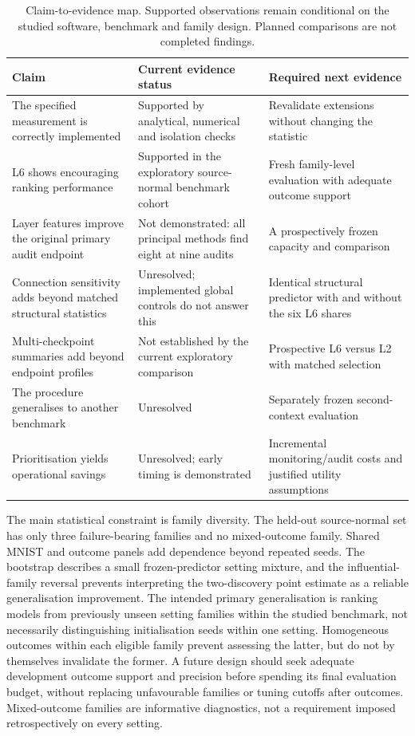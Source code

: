 \documentclass[nolineno]{ieeeaccess}
\begin{document}
\begin{table}[t]
\caption{Claim-to-evidence map. Supported observations remain conditional on the studied software, benchmark and family design. Planned comparisons are not completed findings.}
\label{tab:claims}
\centering\small
\begin{tabularx}{\textwidth}{>{\raggedright\arraybackslash}p{4.5cm}YY}
\toprule Claim & Current evidence status & Required next evidence\\\midrule
The specified measurement is correctly implemented & Supported by analytical, numerical and isolation checks & Revalidate extensions without changing the statistic\\
L6 shows encouraging ranking performance & Supported in the exploratory source-normal benchmark cohort & Fresh family-level evaluation with adequate outcome support\\
Layer features improve the original primary audit endpoint & Not demonstrated: all principal methods find eight at nine audits & A prospectively frozen capacity and comparison\\
Connection sensitivity adds beyond matched structural statistics & Unresolved; implemented global controls do not answer this & Identical structural predictor with and without the six L6 shares\\
Multi-checkpoint summaries add beyond endpoint profiles & Not established by the current exploratory comparison & Prospective L6 versus L2 with matched selection\\
The procedure generalises to another benchmark & Unresolved & Separately frozen second-context evaluation\\
Prioritisation yields operational savings & Unresolved; early timing is demonstrated & Incremental monitoring/audit costs and justified utility assumptions\\\bottomrule
\end{tabularx}
\end{table}

The main statistical constraint is family diversity. The held-out source-normal set has only three failure-bearing families and no mixed-outcome family. Shared MNIST and outcome panels add dependence beyond repeated seeds. The bootstrap describes a small frozen-predictor setting mixture, and the influential-family reversal prevents interpreting the two-discovery point estimate as a reliable generalisation improvement. The intended primary generalisation is ranking models from previously unseen setting families within the studied benchmark, not necessarily distinguishing initialisation seeds within one setting. Homogeneous outcomes within each eligible family prevent assessing the latter, but do not by themselves invalidate the former. A future design should seek adequate development outcome support and precision before spending its final evaluation budget, without replacing unfavourable families or tuning cutoffs after outcomes. Mixed-outcome families are informative diagnostics, not a requirement imposed retrospectively on every setting.
\end{document}
